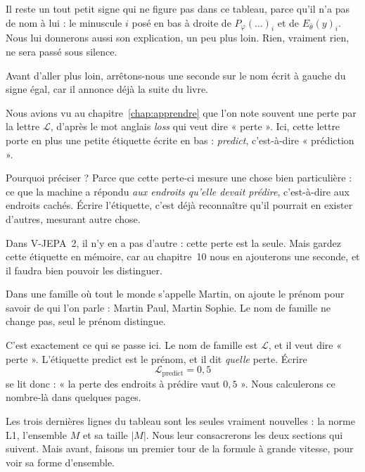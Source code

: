 Il reste un tout petit signe qui ne figure pas dans ce tableau, parce qu'il
n'a pas de nom à lui : le minuscule $i$ posé en bas à droite de
$P_{\varphi}(\ldots)_i$ et de $E_{\bar{\theta}}(y)_i$. Nous lui donnerons
aussi son explication, un peu plus loin. Rien, vraiment rien, ne sera passé
sous silence.

Avant d'aller plus loin, arrêtons-nous une seconde sur le nom écrit à
gauche du signe égal, car il annonce déjà la suite du livre.

\begin{notation}
Nous avions vu au chapitre~\ref{chap:apprendre} que l'on note souvent une
perte par la lettre $\mathcal{L}$, d'après le mot anglais \emph{loss} qui
veut dire « perte ». Ici, cette lettre porte en plus une petite étiquette
écrite en bas : \emph{predict}, c'est-à-dire « prédiction ».

Pourquoi préciser ? Parce que cette perte-ci mesure une chose bien
particulière : ce que la machine a répondu \emph{aux endroits qu'elle devait
prédire}, c'est-à-dire aux endroits cachés. Écrire l'étiquette, c'est déjà
reconnaître qu'il pourrait en exister d'autres, mesurant autre chose.

Dans V-JEPA~2, il n'y en a pas d'autre : cette perte est la seule. Mais
gardez cette étiquette en mémoire, car au chapitre~10 nous en ajouterons une
seconde, et il faudra bien pouvoir les distinguer.
\end{notation}

\begin{exemple}
Dans une famille où tout le monde s'appelle Martin, on ajoute le prénom pour
savoir de qui l'on parle : Martin Paul, Martin Sophie. Le nom de famille ne
change pas, seul le prénom distingue.

C'est exactement ce qui se passe ici. Le nom de famille est $\mathcal{L}$,
et il veut dire « perte ». L'étiquette $\text{predict}$ est le prénom, et il
dit \emph{quelle} perte. Écrire
\[
  \mathcal{L}_{\text{predict}} = 0{,}5
\]
se lit donc : « la perte des endroits à prédire vaut $0{,}5$ ». Nous
calculerons ce nombre-là dans quelques pages.
\end{exemple}

Les trois dernières lignes du tableau sont les seules vraiment nouvelles :
la norme L1, l'ensemble $M$ et sa taille $|M|$. Nous leur consacrerons les
deux sections qui suivent. Mais avant, faisons un premier tour de la formule
à grande vitesse, pour voir sa forme d'ensemble.

